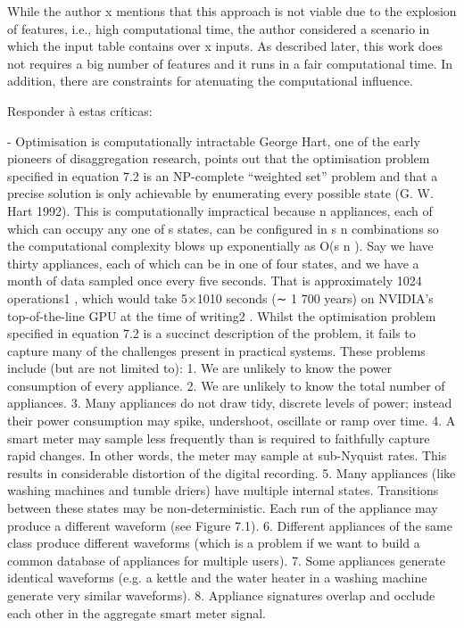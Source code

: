 While the author x mentions that this approach is not viable due to the explosion of features, i.e., high computational time, the author considered a scenario in which the input table contains over x inputs. As described later, this work does not requires a big number of features and it runs in a fair computational time. In addition, there are constraints for atenuating the computational influence. 

\iffalse
Responder à estas críticas:


- Optimisation is computationally intractable
George Hart, one of the early pioneers of disaggregation research, points out that the optimisation
problem specified in equation 7.2 is an NP-complete “weighted set” problem and that
a precise solution is only achievable by enumerating every possible state (G. W. Hart 1992).
This is computationally impractical because n appliances, each of which can occupy any one
of s states, can be configured in s
n
combinations so the computational complexity blows up
exponentially as O(s
n
). Say we have thirty appliances, each of which can be in one of four
states, and we have a month of data sampled once every five seconds. That is approximately
1024 operations1
, which would take 5×1010 seconds (∼ 1 700 years) on NVIDIA’s top-of-the-line
GPU at the time of writing2
.
Whilst the optimisation problem specified in equation 7.2 is a succinct description of the problem,
it fails to capture many of the challenges present in practical systems. These problems
include (but are not limited to):
1. We are unlikely to know the power consumption of every appliance.
2. We are unlikely to know the total number of appliances.
3. Many appliances do not draw tidy, discrete levels of power; instead their power consumption
may spike, undershoot, oscillate or ramp over time.
4. A smart meter may sample less frequently than is required to faithfully capture rapid
changes. In other words, the meter may sample at sub-Nyquist rates. This results in
considerable distortion of the digital recording.
5. Many appliances (like washing machines and tumble driers) have multiple internal states.
Transitions between these states may be non-deterministic. Each run of the appliance
may produce a different waveform (see Figure 7.1).
6. Different appliances of the same class produce different waveforms (which is a problem if
we want to build a common database of appliances for multiple users).
7. Some appliances generate identical waveforms (e.g. a kettle and the water heater in a
washing machine generate very similar waveforms).
8. Appliance signatures overlap and occlude each other in the aggregate smart meter signal.
